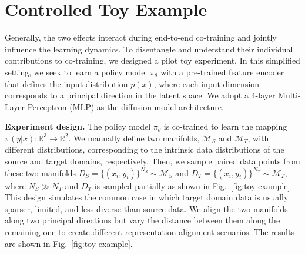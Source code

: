 \section{Controlled Toy Example}
\label{sec: toy example}
Generally, the two effects interact during end-to-end co-training and jointly influence the learning dynamics. To disentangle and understand their individual contributions to co-training, we designed a pilot toy experiment.
In this simplified setting, we seek to learn a policy model $\pi_\theta$ with a pre-trained feature encoder that defines the input distribution $p(x)$, where each input dimension corresponds to a principal direction in the latent space.
We adopt a 4-layer Multi-Layer Perceptron (MLP) as the diffusion model architecture.

\textbf{Experiment design.}
The policy model $\pi_\theta$ is co-trained to learn the mapping $\pi(y|x):\mathbb{R}^3 \rightarrow \mathbb{R}^2$.
We manually define two manifolds, $\mathcal{M}_S$ and $ \mathcal{M}_T$, with different distributions, corresponding to the intrinsic data distributions of the source and target domains, respectively.
Then, we sample paired data points from these two manifolds $D_S=\{(x_i, y_i)\}^{N_S}\sim\mathcal{M}_S$ and $D_T=\{(x_i, y_i)\}^{N_T}\sim\mathcal{M}_T$, where $N_S \gg N_T$ and $D_T$ is sampled partially as shown in Fig.~\ref{fig:toy-example}.
This design simulates the common case in which target domain data is usually sparser, limited, and less diverse than source data.
We align the two manifolds along two principal directions but vary the distance between them along the remaining one to create different representation alignment scenarios.
The results are shown in Fig.~\ref{fig:toy-example}.

